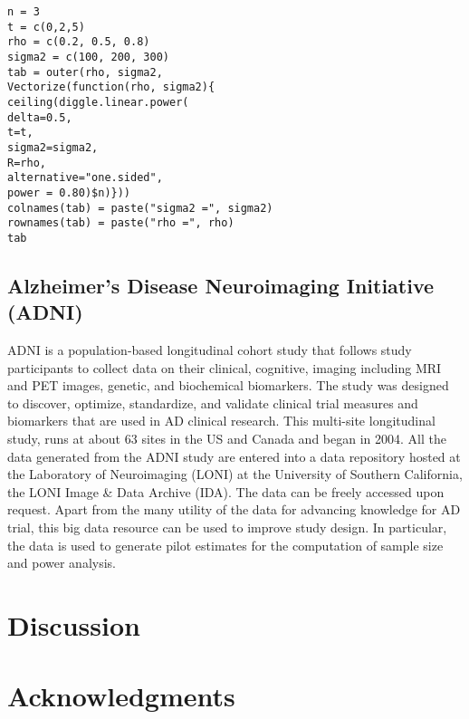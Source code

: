 \documentclass[oupdraft]{bio}
\begin{document}
\begin{mdframed}
\begin{verbatim}
n = 3
t = c(0,2,5)
rho = c(0.2, 0.5, 0.8)
sigma2 = c(100, 200, 300)
tab = outer(rho, sigma2,
Vectorize(function(rho, sigma2){
ceiling(diggle.linear.power(
delta=0.5,
t=t,
sigma2=sigma2,
R=rho,
alternative="one.sided",
power = 0.80)$n)}))
colnames(tab) = paste("sigma2 =", sigma2)
rownames(tab) = paste("rho =", rho)
tab
\end{verbatim}
\end{mdframed}

\subsection{Alzheimer's Disease Neuroimaging Initiative (ADNI)}
ADNI is a population-based longitudinal cohort study that follows study participants to collect data on their clinical, cognitive, imaging including MRI and PET images, genetic, and biochemical biomarkers. The study was designed to discover, optimize, standardize, and validate clinical trial measures and biomarkers that are used in AD clinical research. This multi-site longitudinal study, runs at about 63 sites in the US and Canada and began in 2004. 
All the data generated from the ADNI study are entered into a data repository hosted at the Laboratory of Neuroimaging (LONI) at the University of Southern California, the LONI Image \& Data Archive (IDA). The data can be freely accessed upon request. Apart from the many utility of the data for advancing knowledge for AD trial, this big data resource can be used to improve study design. In particular, the data is used to generate pilot estimates for the computation of sample size and power analysis.

\section{Discussion}
\label{sec4}




\section*{Acknowledgments}
\end{document}
